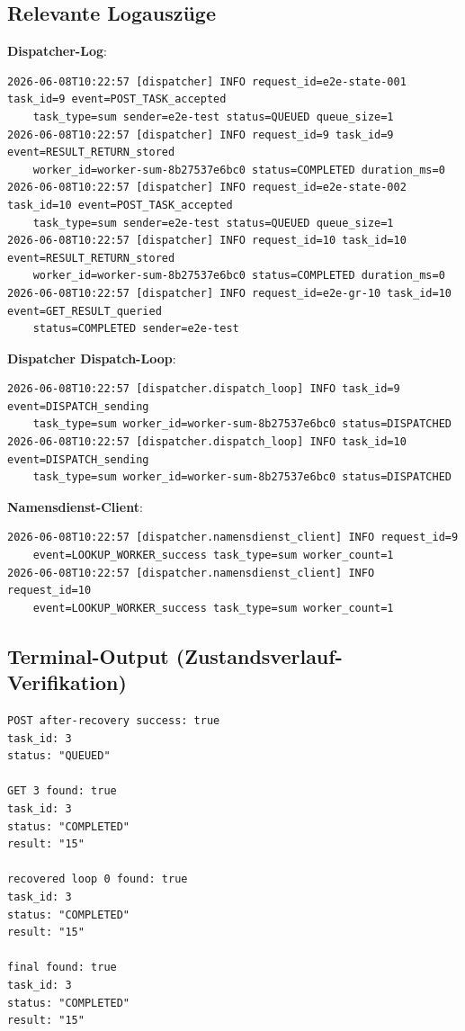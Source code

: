 \documentclass[a4paper,12pt]{article}
\begin{document}
\subsection*{Relevante Logauszüge}

\textbf{Dispatcher-Log}:
\begin{lstlisting}[style=log]
2026-06-08T10:22:57 [dispatcher] INFO request_id=e2e-state-001 task_id=9 event=POST_TASK_accepted
    task_type=sum sender=e2e-test status=QUEUED queue_size=1
2026-06-08T10:22:57 [dispatcher] INFO request_id=9 task_id=9 event=RESULT_RETURN_stored
    worker_id=worker-sum-8b27537e6bc0 status=COMPLETED duration_ms=0
2026-06-08T10:22:57 [dispatcher] INFO request_id=e2e-state-002 task_id=10 event=POST_TASK_accepted
    task_type=sum sender=e2e-test status=QUEUED queue_size=1
2026-06-08T10:22:57 [dispatcher] INFO request_id=10 task_id=10 event=RESULT_RETURN_stored
    worker_id=worker-sum-8b27537e6bc0 status=COMPLETED duration_ms=0
2026-06-08T10:22:57 [dispatcher] INFO request_id=e2e-gr-10 task_id=10 event=GET_RESULT_queried
    status=COMPLETED sender=e2e-test
\end{lstlisting}

\textbf{Dispatcher Dispatch-Loop}:
\begin{lstlisting}[style=log]
2026-06-08T10:22:57 [dispatcher.dispatch_loop] INFO task_id=9 event=DISPATCH_sending
    task_type=sum worker_id=worker-sum-8b27537e6bc0 status=DISPATCHED
2026-06-08T10:22:57 [dispatcher.dispatch_loop] INFO task_id=10 event=DISPATCH_sending
    task_type=sum worker_id=worker-sum-8b27537e6bc0 status=DISPATCHED
\end{lstlisting}

\textbf{Namensdienst-Client}:
\begin{lstlisting}[style=log]
2026-06-08T10:22:57 [dispatcher.namensdienst_client] INFO request_id=9
    event=LOOKUP_WORKER_success task_type=sum worker_count=1
2026-06-08T10:22:57 [dispatcher.namensdienst_client] INFO request_id=10
    event=LOOKUP_WORKER_success task_type=sum worker_count=1
\end{lstlisting}

\subsection*{Terminal-Output (Zustandsverlauf-Verifikation)}

\begin{lstlisting}[style=log]
POST after-recovery success: true
task_id: 3
status: "QUEUED"

GET 3 found: true
task_id: 3
status: "COMPLETED"
result: "15"

recovered loop 0 found: true
task_id: 3
status: "COMPLETED"
result: "15"

final found: true
task_id: 3
status: "COMPLETED"
result: "15"
\end{lstlisting}
\end{document}
